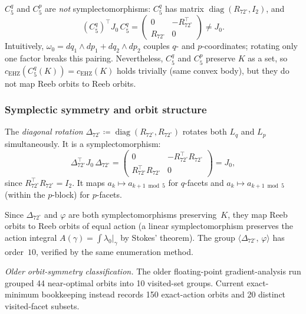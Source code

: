 \begin{unverified}
\begin{remark}\label{rem:non-symplectic-rotations}
$C_5^q$ and $C_5^p$ are \emph{not} symplectomorphisms:
$C_5^q$ has matrix $\operatorname{diag}(R_{72^\circ}, I_2)$, and
\[
  (C_5^q)^\top J_0\, C_5^q
  = \begin{pmatrix} 0 & -R_{72^\circ}^\top \\ R_{72^\circ} & 0 \end{pmatrix}
  \neq J_0.
\]
Intuitively, $\omega_0 = dq_1 \wedge dp_1 + dq_2 \wedge dp_2$ couples
$q$- and $p$-coordinates; rotating only one factor breaks this pairing.
Nevertheless, $C_5^q$ and $C_5^p$ preserve $K$ as a set, so
$c_{\mathrm{EHZ}}(C_5^q(K)) = c_{\mathrm{EHZ}}(K)$
holds trivially (same convex body), but they do not map Reeb orbits
to Reeb orbits.
\end{remark}
\end{unverified}

\subsubsection*{Symplectic symmetry and orbit structure}

The \emph{diagonal rotation}
$\Delta_{72^\circ} \coloneqq \operatorname{diag}(R_{72^\circ}, R_{72^\circ})$
rotates both $L_q$ and $L_p$ simultaneously.
It is a symplectomorphism:
\[
  \Delta_{72^\circ}^\top J_0\, \Delta_{72^\circ}
  = \begin{pmatrix} 0 & -R_{72^\circ}^\top R_{72^\circ} \\
    R_{72^\circ}^\top R_{72^\circ} & 0 \end{pmatrix}
  = J_0,
\]
since $R_{72^\circ}^\top R_{72^\circ} = I_2$.
It maps $a_k \mapsto a_{k+1\bmod 5}$ for $q$-facets and
$a_k \mapsto a_{k+1\bmod 5}$ (within the $p$-block) for $p$-facets.

Since $\Delta_{72^\circ}$ and $\varphi$ are both symplectomorphisms
preserving~$K$,
they map Reeb orbits to Reeb orbits of equal action
(a linear symplectomorphism preserves the action integral
$A(\gamma) = \int \lambda_0|_\gamma$ by Stokes' theorem).
The group $\langle \Delta_{72^\circ},\, \varphi \rangle$ has order~$10$,
verified by the same enumeration method.

\emph{Older orbit-symmetry classification.}
The older floating-point gradient-analysis run grouped 44 near-optimal
orbits into 10 visited-set groups.  Current exact-minimum bookkeeping instead
records 150 exact-action orbits and 20 distinct visited-facet subsets.

